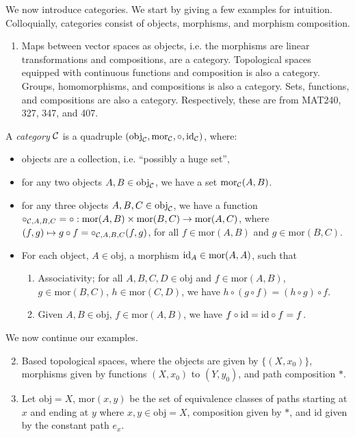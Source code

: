 \noindent We now introduce categories. We start by giving a few examples for intuition. Colloquially, categories consist of objects, morphisms, and morphism composition.
\begin{enumerate}[label=(\alph*)]
    \item Maps between vector spaces as objects, i.e. the morphisms are linear transformations and compositions, are a category. Topological spaces equipped with continuous functions and composition is also a category. Groups, homomorphisms, and compositions is also a category. Sets, functions, and compositions are also a category. Respectively, these are from MAT240, 327, 347, and 407.
\end{enumerate}
\begin{definition}
    A \textit{category} $\mathcal C$ is a quadruple $(\mathrm{obj}_\mathcal C, \mathrm{mor}_\mathcal C, \circ, \mathrm{id}_\mathcal C)$, where:
    \begin{itemize}
        \item objects are a collection, i.e. ``possibly a huge set'',
        \item for any two objects $A, B \in \mathrm{obj}_\mathcal C$, we have a set $\mathrm{mor}_\mathcal C(A, B)$.
        \item for any three objects $A, B, C \in \mathrm{obj}_\mathcal C$, we have a function $\circ_{\mathcal C, A, B, C} = \circ : \mathrm{mor}(A, B) \times \mathrm{mor}(B, C) \to \mathrm{mor}(A, C)$, where $(f, g) \mapsto g \circ f = \circ_{\mathcal C, A, B, C}(f, g)$, for all $f \in \mathrm{mor}(A, B)$ and $g \in \mathrm{mor}(B, C)$.
        \item For each object, $A \in \mathrm{obj}$, a morphism $\mathrm{id}_A \in \mathrm{mor}(A, A)$, such that
        \begin{enumerate}[label=(\roman*)]
            \item Associativity; for all $A, B, C, D \in \mathrm{obj}$ and $f \in \mathrm{mor}(A, B)$, $g \in \mathrm{mor}(B, C)$, $h \in \mathrm{mor}(C, D)$, we have $h \circ (g \circ f) = (h \circ g) \circ f$.
            \item Given $A, B \in \mathrm{obj}$, $f \in \mathrm{mor}(A, B)$, we have $f \circ \mathrm{id} = \mathrm{id} \circ f = f$.
        \end{enumerate}
    \end{itemize}
\end{definition}
\noindent We now continue our examples.
\begin{enumerate}[label=(\alph*)]
    \setcounter{enumi}{1}
    \item Based topological spaces, where the objects are given by $\{(X, x_0)\}$, morphisms given by functions $(X, x_0)$ to $(Y, y_0)$, and path composition $\ast$.
    \item Let $\mathrm{obj} = X$, $\mathrm{mor}(x, y)$ be the set of equivalence classes of paths starting at $x$ and ending at $y$ where $x, y \in \mathrm{obj} = X$, composition given by $\ast$, and $\mathrm{id}$ given by the constant path $e_x$.
\end{enumerate}
